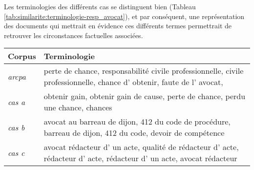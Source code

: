 Les terminologies des différents cas se distinguent bien (Tableau \ref{tab:similarite:terminologie-resp_avocat}), et par conséquent, une représentation des documents qui mettrait en évidence ces différents termes permettrait de retrouver les circonstances factuelles associées. 
\begin{table}[ht]
	\centering \scriptsize
	\begin{tabular}{|l|p{}|}
		\hline
		\textbf{Corpus} & \textbf{Terminologie} \\ \hline
		\textit{arcpa} & perte de chance, 
		responsabilité civile professionnelle, 
		civile professionnelle, 
		chance d' obtenir, 
		faute de l' avocat, 
		\\ \hline
		\textit{cas a} & obtenir gain,
		obtenir gain de cause,
		perte de chance,
		perdu une chance,
		chances
		\\ \hline
		\textit{cas b} & avocat au barreau de dijon,
		412 du code de procédure,
		barreau de dijon,
		412 du code,
		devoir de compétence
		\\ \hline
		\textit{cas c} &avocat rédacteur d' un acte,
		qualité de rédacteur d' acte,
		rédacteur d' acte,
		rédacteur d' un acte,
		avocat rédacteur

\end{tabular}
\end{table}
